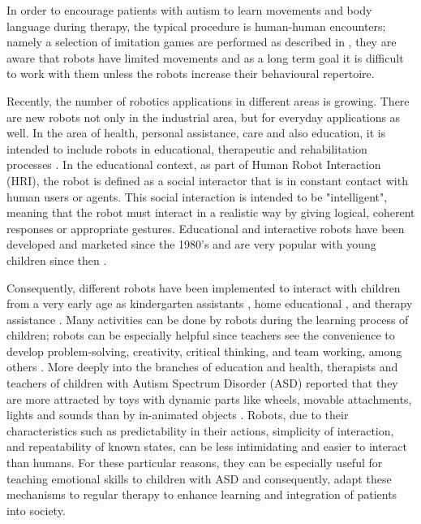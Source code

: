\documentclass[thesis]{mas_proposal}
\begin{document}
\begin{itemize}
    In order to encourage patients with autism to learn movements and body language during therapy, the typical procedure is human-human encounters; namely a selection of imitation games are performed as described in \cite{dautenhahn2004}, they are aware that robots have limited movements and as a long term goal it is difficult to work with them unless the robots increase their behavioural repertoire.
    
    
    Recently, the number of robotics applications in different areas is growing. There are new robots not only in the industrial area, but for everyday applications as well. In the area of health, personal assistance, care and also education, it is intended to include robots in educational, therapeutic and rehabilitation processes \cite{Stein2005}. In the educational context, as part of Human Robot Interaction (HRI), the robot is defined as a social interactor that is in constant contact with human users or agents. This social interaction is intended to be "intelligent", meaning that the robot must interact in a realistic way by giving logical, coherent responses or appropriate gestures. Educational and interactive robots have been developed and marketed since the 1980's and are very popular with young children since then \cite{Sheridan2016}. 
   	
   	
    
    Consequently, different robots have been implemented to interact with children from a very early age as kindergarten assistants \cite{Oliveira2016}, home educational \cite{Jeonghye2005}, and therapy assistance \cite{Vulpe2021}. Many activities can be done by robots during the learning process of children; robots can be especially helpful since teachers see the convenience to develop problem-solving, creativity, critical thinking, and team working, among others \cite{Vostinar2019}. More deeply into the branches of education and health, therapists and teachers of children with Autism Spectrum Disorder (ASD) reported that they are more attracted by toys with dynamic parts like wheels, movable attachments, lights and sounds than by in-animated objects \cite{Qidwai2013}. Robots, due to their characteristics such as predictability in their actions, simplicity of interaction, and repeatability of known states, can be less intimidating and easier to interact than humans. For these particular reasons, they can be especially useful for teaching emotional skills to children with ASD \cite{costa2017socially} and consequently, adapt these mechanisms to regular therapy to enhance learning and integration of patients into society.
    

\end{itemize}
\end{document}
